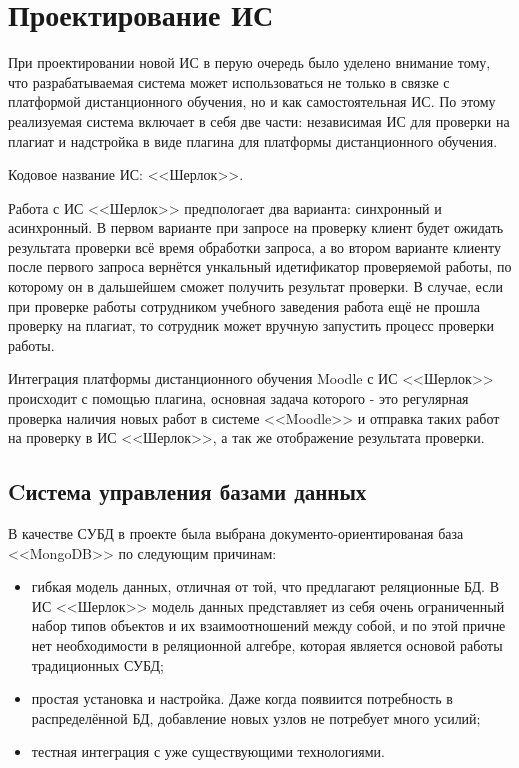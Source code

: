 \section{Проектирование ИС}

	При проектировании новой ИС в перую очередь было уделено внимание тому, что разрабатываемая система может использоваться не только в связке с платформой дистанционного обучения, но и как самостоятельная ИС. По этому реализуемая система включает в себя две части: независимая ИС для проверки на плагиат и надстройка в виде плагина для платформы дистанционного обучения.

	Кодовое название ИС: <<Шерлок>>.

	Работа с ИС <<Шерлок>> предпологает два варианта: синхронный и асинхронный. В первом варианте при запросе на проверку клиент будет ожидать результата проверки всё время обработки запроса, а во втором варианте клиенту после первого запроса вернётся ункальный идетификатор проверяемой работы, по которому он в дальшейшем сможет получить результат проверки. В случае, если при проверке работы сотрудником учебного заведения работа ещё не прошла проверку на плагиат, то сотрудник может вручную запустить процесс проверки работы. 

	Интеграция платформы дистанционного обучения Moodle с ИС <<Шерлок>> происходит с помощью плагина, основная задача которого - это регулярная проверка наличия новых работ в системе <<Moodle>> и отправка таких работ на проверку в ИС <<Шерлок>>, а так же отображение результата проверки.

	\subsection{Cистема управления базами данных}

		В качестве СУБД в проекте была выбрана документо-ориентированая база <<MongoDB>> по следующим причинам:
		\begin{itemize}
			\item гибкая модель данных, отличная от той, что предлагают реляционные БД. В ИС <<Шерлок>> модель данных представляет из себя очень ограниченный набор типов объектов и их взаимоотношений между собой, и по этой причне нет необходимости в реляционной алгебре, которая является основой работы традиционных СУБД;
			\item простая установка и настройка. Даже когда появиится потребность в распределённой БД, добавление новых узлов не потребует много усилий;
			\item тестная интеграция с уже существующими технологиями.
		\end{itemize}

